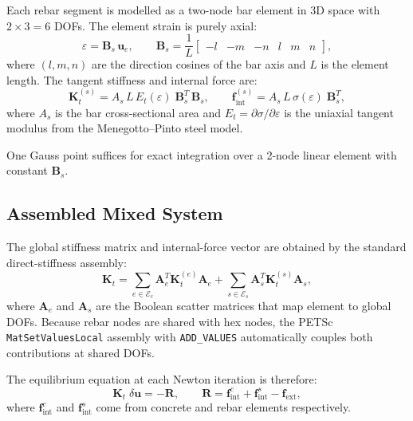 Each rebar segment is modelled as a two-node bar element in 3D space
with $2 \times 3 = 6$ DOFs.  The element strain is purely axial:
\begin{equation}
  \label{eq:truss-eps}
  \varepsilon = \mathbf{B}_s \, \mathbf{u}_e,
  \qquad
  \mathbf{B}_s = \frac{1}{L}
  \begin{bmatrix} -l & -m & -n & l & m & n \end{bmatrix},
\end{equation}
where $(l, m, n)$ are the direction cosines of the bar axis and $L$ is
the element length.  The tangent stiffness and internal force are:
\begin{equation}
  \label{eq:truss-Kt}
  \mathbf{K}_t^{(s)} = A_s \, L \, E_t(\varepsilon)\;
  \mathbf{B}_s^T \, \mathbf{B}_s,
  \qquad
  \mathbf{f}_{\text{int}}^{(s)} = A_s \, L \, \sigma(\varepsilon)\;
  \mathbf{B}_s^T,
\end{equation}
where $A_s$ is the bar cross-sectional area and
$E_t = \partial\sigma / \partial\varepsilon$ is
the uniaxial tangent modulus from the Menegotto--Pinto steel model.

One Gauss point suffices for exact integration over a 2-node linear
element with constant $\mathbf{B}_s$.

\subsection{Assembled Mixed System}

The global stiffness matrix and internal-force vector are obtained by
the standard direct-stiffness assembly:
\begin{equation}
  \label{eq:mixed-assembly}
  \mathbf{K}_t = \sum_{e \in \mathcal{E}_c} \mathbf{A}_e^T
    \mathbf{K}_t^{(e)} \mathbf{A}_e
  + \sum_{s \in \mathcal{E}_s} \mathbf{A}_s^T
    \mathbf{K}_t^{(s)} \mathbf{A}_s,
\end{equation}
where $\mathbf{A}_e$ and $\mathbf{A}_s$ are the Boolean scatter
matrices that map element to global DOFs.  Because rebar nodes are
shared with hex nodes, the PETSc \texttt{MatSetValuesLocal} assembly
with \texttt{ADD\_VALUES} automatically couples both contributions at
shared DOFs.

The equilibrium equation at each Newton iteration is therefore:
\begin{equation}
  \label{eq:mixed-Newton}
  \mathbf{K}_t\;\delta\mathbf{u} = -\mathbf{R},
  \qquad
  \mathbf{R} = \mathbf{f}_{\text{int}}^c + \mathbf{f}_{\text{int}}^s
               - \mathbf{f}_{\text{ext}},
\end{equation}
where $\mathbf{f}_{\text{int}}^c$ and $\mathbf{f}_{\text{int}}^s$
come from concrete and rebar elements respectively.


